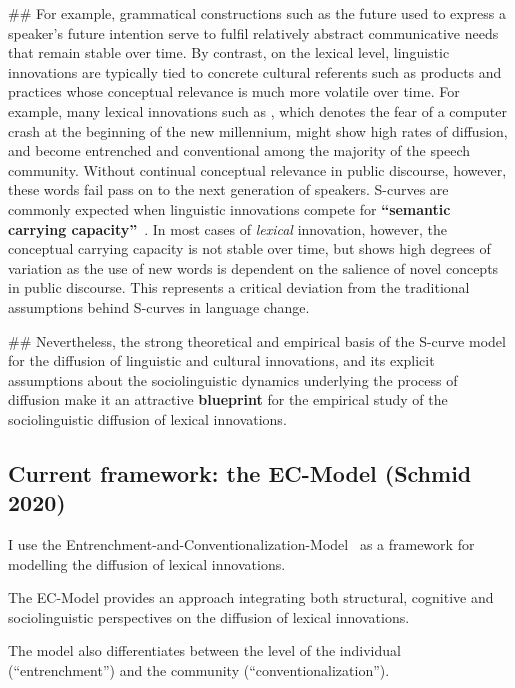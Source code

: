 \documentclass[
  a4paper,
  abstract=on,
  captions=tableabove
  ]{scrartcl}
\renewcommand{\hw}[1]{\textbf{#1}}
\begin{document}
\begin{easylist}[itemize]
  ## For example, grammatical constructions such as the  future used to express a speaker's future intention serve to fulfil relatively abstract communicative needs that remain stable over time. By contrast, on the lexical level, linguistic innovations are typically tied to concrete cultural referents such as products and practices whose conceptual relevance is much more volatile over time. For example, many lexical innovations such as , which denotes the fear of a computer crash at the beginning of the new millennium, might show high rates of diffusion, and become entrenched and conventional among the majority of the speech community. Without continual conceptual relevance in public discourse, however, these words fail pass on to the next generation of speakers. S-curves are commonly expected when linguistic innovations compete for \hw{\enquote{semantic carrying capacity}}~\parencite{Nini2017ApplicationGrowth}. In most cases of \emph{lexical} innovation, however, the conceptual carrying capacity is not stable over time, but shows high degrees of variation as the use of new words is dependent on the salience of novel concepts in public discourse. This represents a critical deviation from the traditional assumptions behind S-curves in language change.

  ## Nevertheless, the strong theoretical and empirical basis of the S-curve model for the diffusion of linguistic and cultural innovations, and its explicit assumptions about the sociolinguistic dynamics underlying the process of diffusion make it an attractive \hw{blueprint} for the empirical study of the sociolinguistic diffusion of lexical innovations.

  \end{easylist}


  \subsection{Current framework: the EC-Model (Schmid 2020)}
    \label{subsec:ec-model}

  I use the Entrenchment-and-Conventionalization-Model~\parencite{Schmid2020DynamicsLinguistic} as a framework for modelling the diffusion of lexical innovations.

  The EC-Model provides an approach integrating both structural, cognitive and sociolinguistic perspectives on the diffusion of lexical innovations.

  The model also differentiates between the level of the individual (\enquote{entrenchment}) and the community (\enquote{conventionalization}).
\end{document}
